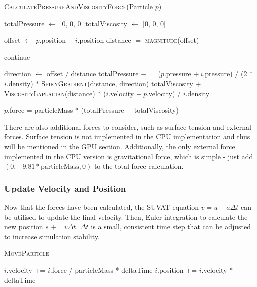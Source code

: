 \documentclass[12pt]{article}
\begin{document}
    \begin{algorithm}[H]
        \caption{\textsc{CalculatePressureAndViscosityForce}(Particle $p$)}

        \begin{algorithmic}[1]
            \State totalPressure $\gets$ [0, 0, 0]
            \State totalViscosity $\gets$ [0, 0, 0]

                \State offset $\gets$ $p$.position $-\ i$.position
                \State distance $=$ \textsc{magnitude}(offset)

                    continue
                \EndIf

                \State direction $\gets$ offset $/$ distance
                \State totalPressure $-=$ ($p$.pressure $+\ i$.pressure) $/$ (2 * $i$.density) $*$ \textsc{SpikyGradient}(distance, direction)
                \State totalViscosity += \textsc{ViscosityLaplacian}(distance) *
                \Statex \hspace{\algorithmicindent} ($i$.velocity $-\ p$.velocity) / $i$.density
            \EndFor
            
            \State $p$.force = particleMass * (totalPressure + totalViscosity)
        \end{algorithmic}

    \end{algorithm}

    There are also additional forces to consider, such as surface tension and external forces. Surface tension is not implemented in the CPU implementation and thus will be mentioned in the GPU section. Additionally, the only external force implemented in the CPU version is gravitational force, which is simple - just add $(0, -9.81 * \text{particleMass}, 0)$ to the total force calculation.

    \subsubsection{Update Velocity and Position}
    Now that the forces have been calculated, the SUVAT equation $v = u + a\Delta{t}$ can be utilised to update the final velocity. Then, Euler integration to calculate the new position $s$ += $v\Delta{t}$. $\Delta{t}$ is a small, consistent time step that can be adjusted to increase simulation stability.

    \begin{algorithm}[H]
        \caption{\textsc{MoveParticle}}
    
        \begin{algorithmic}[1]
                \State $i$.velocity += $i$.force / particleMass * deltaTime
                \State $i$.position += $i$.velocity * deltaTime
            \EndFor
        \end{algorithmic}

    \end{algorithm}
\end{document}
